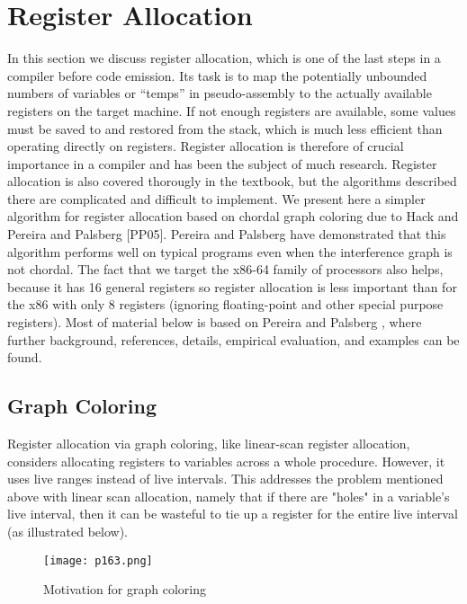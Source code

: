 \newpage

\section{Register Allocation}

In this section we discuss register allocation, which is one of the last steps
in a compiler before code emission. Its task is to map the potentially unbounded numbers of variables or “temps” in pseudo-assembly to the actually available registers on the target machine. If not enough registers are
available, some values must be saved to and restored from the stack, which
is much less efficient than operating directly on registers. Register allocation is therefore of crucial importance in a compiler and has been the subject of much research. Register allocation is also covered thorougly in the
textbook, but the algorithms described there are complicated and difficult to implement. We present here a simpler algorithm
for register allocation based on chordal graph coloring due to Hack \cite{hack2006register}
and Pereira and Palsberg [PP05]. Pereira and Palsberg have demonstrated
that this algorithm performs well on typical programs even when the interference graph is not chordal. The fact that we target the x86-64 family
of processors also helps, because it has 16 general registers so register allocation is less important than for the x86 with only 8 registers (ignoring
floating-point and other special purpose registers).
Most of material below is based on Pereira and Palsberg \cite{pereira2005register}, where
further background, references, details, empirical evaluation, and examples can be found.




\subsection{Graph Coloring}


Register allocation via graph coloring, like linear-scan register allocation, considers allocating registers to variables across a whole procedure. However, it uses live ranges instead of live intervals. This addresses the problem mentioned above with linear scan allocation, namely that if there are "holes" in a variable's live interval, then it can be wasteful to tie up a register for the entire live interval (as illustrated below).


\begin{figure}[H]
	\centering
	\texttt{[image: p163.png]}
	\caption{Motivation for graph coloring}
	\label{fig:p163}
\end{figure}


